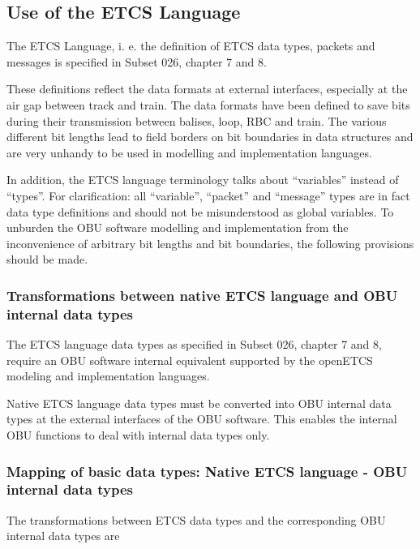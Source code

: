 \subsection{Use of the ETCS Language}
\label{sec:ETCSLanguage}

The ETCS Language, i. e. the definition of ETCS data types, packets and messages is specified in Subset 026, chapter 7 and 8. 

These definitions reflect the data formats at external interfaces, especially at the air gap between track and train. The data formats have been defined to save bits during their transmission between balises, loop, RBC and train. The various different bit lengths lead to field borders on bit boundaries in data structures and are very unhandy to be used in modelling and implementation languages. 

In addition, the ETCS language terminology talks about “variables” instead of “types”. For clarification: all “variable”, “packet” and “message” types are in fact data type definitions and should not be misunderstood as global variables. 
To unburden the OBU software modelling and implementation from the inconvenience of arbitrary bit lengths and bit boundaries, the following provisions should be made.

\subsubsection{Transformations between native ETCS language and OBU internal data types}

The ETCS language data types as specified in  Subset 026, chapter 7 and 8, require an OBU software internal equivalent supported by the openETCS modeling and implementation languages.  

Native ETCS language data types must be converted into OBU internal data types at the external interfaces of the OBU software.
This enables the internal OBU functions to deal with internal data types only. 

\subsubsection{Mapping of basic data types: Native ETCS language - OBU internal data types}

The transformations between ETCS data types and the corresponding OBU internal data types are

